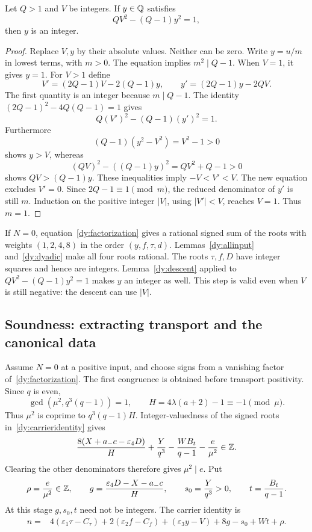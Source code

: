 \begin{lemma}
\label{dy:descent}
Let $Q>1$ and $V$ be integers.  If $y\in\mathbb Q$ satisfies
\[
 QV^2-(Q-1)y^2=1,
\]
then $y$ is an integer.
\end{lemma}

\begin{proof}
Replace $V,y$ by their absolute values.  Neither can be zero.
Write $y=u/m$ in lowest terms, with $m>0$.  The equation implies
$m^2\mid Q-1$.  When $V=1$, it gives $y=1$.
For $V>1$ define
\[
 V'=(2Q-1)V-2(Q-1)y,\qquad
 y'=(2Q-1)y-2QV.
\]
The first quantity is an integer because $m\mid Q-1$.  The identity
$(2Q-1)^2-4Q(Q-1)=1$ gives
\[
 Q(V')^2-(Q-1)(y')^2=1.
\]
Furthermore
\[
 (Q-1)(y^2-V^2)=V^2-1>0
\]
shows $y>V$, whereas
\[
 (QV)^2-((Q-1)y)^2=QV^2+Q-1>0
\]
shows $QV>(Q-1)y$.  These inequalities imply $-V<V'<V$.
The new equation excludes $V'=0$.  Since $2Q-1\equiv1\pmod m$,
the reduced denominator of $y'$ is still $m$.
Induction on the positive integer $|V|$, using $|V'|<V$, reaches $V=1$.
Thus $m=1$.
\end{proof}

If $N=0$, equation~\eqref{dy:factorization} gives a rational signed
sum of the roots with weights $(1,2,4,8)$ in the order $(y,f,\tau,d)$.
Lemmas~\ref{dy:allinput} and~\ref{dy:dyadic} make all four roots rational.
The roots $\tau,f,D$ have integer squares and hence are integers.
Lemma~\ref{dy:descent} applied to
$QV^2-(Q-1)y^2=1$ makes $y$ an integer as well.  This step is valid even
when $V$ is still negative: the descent can use $|V|$.

\subsection{Soundness: extracting transport and the canonical data}
\label{dy:soundness}

Assume $N=0$ at a positive input, and choose signs from a vanishing factor
of~\eqref{dy:factorization}.  The first congruence is obtained before
transport positivity.  Since $q$ is even,
\[
 \gcd(\mu^2,q^3(q-1))=1,
 \qquad H=4\lambda(a+2)-1\equiv-1\pmod\mu.
\]
Thus $\mu^2$ is coprime to $q^3(q-1)H$.  Integer-valuedness of the
signed roots in~\eqref{dy:carrieridentity} gives
\[
 \frac{8(X+a_-c-\varepsilon_4D)}H+\frac Y{q^3}
           -\frac{WB_t}{q-1}-\frac e{\mu^2}\in\mathbb Z.
\]
Clearing the other denominators therefore gives $\mu^2\mid e$.
Put
\begin{equation}
 \rho=\frac e{\mu^2}\in\mathbb Z,\qquad
 g=\frac{\varepsilon_4D-X-a_-c}{H},\qquad
 s_0=\frac Y{q^3}>0,\qquad t=\frac{B_t}{q-1}.
 \label{dy:fractionnames}
\end{equation}
At this stage $g,s_0,t$ need not be integers.  The carrier identity is
\begin{align}
 n={}&4(\varepsilon_1\tau-C_\tau)
       +2(\varepsilon_2 f-C_f)+(\varepsilon_3y-V)
       +8g-s_0+Wt+\rho.
 \label{dy:nequation}
\end{align}


